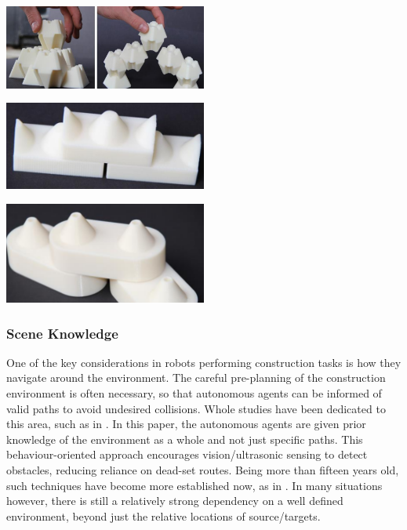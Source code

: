 \documentclass[11pt]{article}
\begin{document}
\begin{center}
\includegraphics[width = 0.5\textwidth]{droxel.png}
\label{figure:droxel}

\includegraphics[width = 0.5\textwidth]{cid.png}
\label{figure:cid}

\includegraphics[width = 0.5\textwidth]{rcid.png}
\label{figure:rcid}

\end{center}



\subsubsection{Scene Knowledge}
One of the key considerations in robots performing construction tasks is how they navigate around the environment. The careful pre-planning of the construction environment is often necessary, so that autonomous agents can be informed of valid paths to avoid undesired collisions. Whole studies have been dedicated to this area, such as in \cite{Arkin1990}. In this paper, the autonomous agents are given prior knowledge of the environment as a whole and not just specific paths. This behaviour-oriented approach encourages vision/ultrasonic sensing to detect obstacles, reducing reliance on dead-set routes. Being more than fifteen years old, such techniques have become more established now, as in \cite{Petersen2011}. In many situations however, there is still a relatively strong dependency on a well defined environment, beyond just the relative locations of source/targets.
\end{document}
